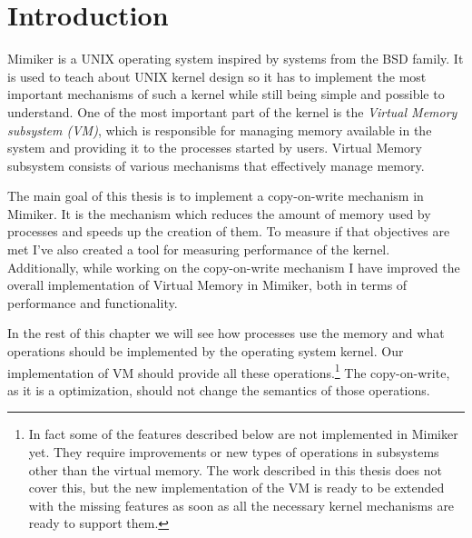 \chapter{Introduction}
\label{chapter:introduction}

Mimiker is a UNIX operating system inspired by systems from the BSD family.
It is used to teach about UNIX kernel design so it has to implement the most important mechanisms of such a kernel
while still being simple and possible to understand.
One of the most important part of the kernel is the {\it Virtual Memory subsystem (VM)},
which is responsible for managing memory available in the system and providing it to the processes started by users.
Virtual Memory subsystem consists of various mechanisms that effectively manage memory.

The main goal of this thesis is to implement a copy-on-write mechanism in Mimiker.
It is the mechanism which reduces the amount of memory used by processes and speeds up the creation of them.
To measure if that objectives are met I've also created a tool for measuring performance of the kernel.
Additionally, while working on the copy-on-write mechanism I have improved the overall implementation of Virtual Memory in Mimiker,
both in terms of performance and functionality.

In the rest of this chapter we will see how processes use the memory and what operations should be implemented by the operating system kernel.
Our implementation of VM should provide all these operations.\footnote{
  In fact some of the features described below are not implemented in Mimiker yet.
  They require improvements or new types of operations in subsystems other than the virtual memory.
  The work described in this thesis does not cover this, but the new implementation of the VM is ready
  to be extended with the missing features as soon as all the necessary kernel mechanisms are ready to support them.
}
The copy-on-write, as it is a optimization, should not change the semantics of those operations.


